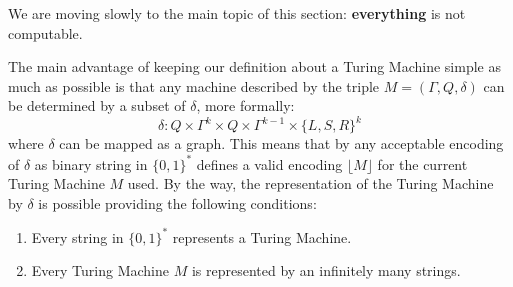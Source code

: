 We are moving slowly to the main topic of this section: \textbf{everything} is not computable. \vspace{7pt}

The main advantage of keeping our definition about a Turing Machine simple as much as possible is that any machine described by the triple $M = (\Gamma, Q, \delta)$
can be determined by a subset of $\delta$, more formally:
$$ \delta: Q \times \Gamma^{k} \times Q \times \Gamma^{k-1} \times \{L,S,R\}^{k} $$
where $\delta$ can be mapped as a graph. This means that by any acceptable encoding of $\delta$ as binary string in $\{0,1\}^*$ defines a valid encoding $\lfloor M \rfloor$ 
for the current Turing Machine $M$ used. By the way, the representation of the Turing Machine by $\delta$ is possible providing the following conditions:
\begin{enumerate}
    \item Every string in $\{0,1\}^*$ represents a Turing Machine.
    \item Every Turing Machine $M$ is represented by an infinitely many strings.
\end{enumerate}